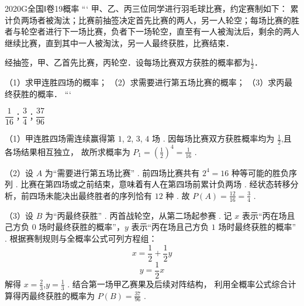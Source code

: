 \documentclass[12pt,UTF-8,a4paper]{ctexart}
\numberwithin{figure}{section}
\theoremstyle{mystyle}
\theoremstyle{mystylekaishu}
\theoremstyle{mystyle}
\numberwithin{xiti}{section}
\begin{document}

\begin{problem}{2020}{G}{全国Ⅰ卷}{19}{概率}
```
甲、乙、丙三位同学进行羽毛球比赛，约定赛制如下：  
累计负两场者被淘汰；比赛前抽签决定首先比赛的两人，另一人轮空；每场比赛的胜者与轮空者进行下一场比赛，负者下一场轮空，直至有一人被淘汰后，剩余的两人继续比赛，直到其中一人被淘汰，另一人最终获胜，比赛结束．  

经抽签，甲、乙首先比赛，丙轮空．设每场比赛双方获胜的概率都为$\frac{1}{2}$．  

（1）求甲连胜四场的概率；  
（2）求需要进行第五场比赛的概率；  
（3）求丙最终获胜的概率．
```
\end{problem}

\begin{answer}
$\dfrac{1}{16}；\dfrac{3}{4}；\dfrac{37}{96}$
\end{answer}

\begin{solutions}
（1）甲连胜四场需连续赢得第 $1$, $2$, $3$, $4$ 场 .
因每场比赛双方获胜概率均为 $\displaystyle \frac{1}{2}$,且各场结果相互独立，
故所求概率为 $P_1 = \left(\displaystyle \frac{1}{2}\right)^4 = \displaystyle \frac{1}{16}$ .

（2）设 $A$ 为“需要进行第五场比赛” .
前四场比赛共有 $2^4 = 16$ 种等可能的胜负序列 .
比赛在第四场或之前结束，意味着有人在第四场前累计负两场 .
经状态转移分析，前四场未能决出最终胜者的序列恰有 $12$ 种 .
故 $P(A) = \displaystyle \frac{12}{16} = \displaystyle \frac{3}{4}$ .

（3）设 $B$ 为“丙最终获胜” .
丙首战轮空，从第二场起参赛 .
记 $x$ 表示“丙在场且己方负 $0$ 场时最终获胜的概率”，$y$ 表示“丙在场且己方负 $1$ 场时最终获胜的概率” .
根据赛制规则与全概率公式可列方程组：
$$
x = \displaystyle \frac{1}{2} + \displaystyle \frac{1}{2} y
$$
$$
y = \displaystyle \frac{1}{2} x
$$
解得 $x = \displaystyle \frac{2}{3}$,$y = \displaystyle \frac{1}{3}$ .
结合第一场甲乙赛果及后续对阵结构，
利用全概率公式综合计算得丙最终获胜的概率为 $P(B) = \displaystyle \frac{37}{96}$ .
\end{solutions}
\end{document}
